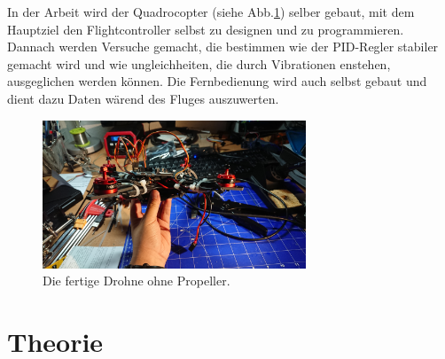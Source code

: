 \documentclass[12pt,a4paper, ngerman]{article}
\begin{document}
In der Arbeit wird der Quadrocopter (siehe Abb.\ref{drohne}) selber gebaut, mit dem Hauptziel den Flightcontroller selbst zu designen und zu programmieren. Dannach werden Versuche gemacht, die bestimmen wie der PID-Regler stabiler gemacht wird und wie ungleichheiten, die durch Vibrationen enstehen, ausgeglichen werden können. Die Fernbedienung wird auch selbst gebaut und dient dazu Daten wärend des Fluges auszuwerten. 
\begin{figure}[h]
\captionsetup{singlelinecheck = false, format= hang, justification=raggedright, font=footnotesize, labelsep=space}
\includegraphics[width=0.70\textwidth]{Drohne.jpg}
\caption[]{Die fertige Drohne ohne Propeller.} \label{drohne}
\end{figure}
\newpage
\section{Theorie}
\end{document}
